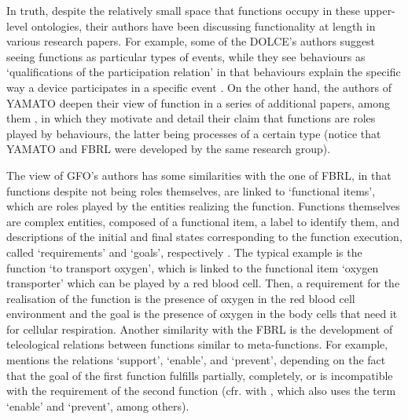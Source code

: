 \documentclass[sw]{iosart2x}
\newcommand{\DOLCE}{\textsc{DOLCE}\xspace} %
\newcommand{\YAMATO}{\textsc{YAMATO}\xspace}
\newcommand{\GFO}{\textsc{GFO}\xspace}
\begin{document}
In truth, despite the relatively small space that functions occupy in these upper-level ontologies, their authors have been discussing functionality at length in various research papers. 
For example, some of the \DOLCE's authors suggest seeing functions as particular types of events, while they see behaviours as `qualifications of the participation relation' in that behaviours explain the specific way a device participates in a specific event \cite{borgoCapabilitiesCapacitiesFunctionalities2021,borgoFormalizationFunctionsOperations2011, garbaczTwoOntologydrivenFormalisations2011}. On the other hand, the authors of \YAMATO deepen their view of function in a series of additional papers, among them \cite{kitamuraOntologicalModelDevice2006, kitamuraCharacterizingFunctionsBased2013, mizoguchiFunctionalOntologyArtifacts2009,mizoguchiUnifyingDefinitionArtifact2016}, in which they motivate and detail their claim that functions are roles played by behaviours, the latter being processes of a certain type (notice that \YAMATO  and FBRL were developed by the same research group).

The view of \GFO's authors has some similarities with the one of FBRL, in that functions despite not being roles themselves, are linked to `functional items', which are roles played by the entities realizing the function. Functions themselves are complex entities, composed of a functional item, a label to identify them, and descriptions of the initial and final states corresponding to the function execution, called `requirements' and `goals', respectively \cite{burekToplevelOntologyFunctions2006,burekOverviewGFOFunctions2021}. The typical example is the function `to transport oxygen', which is linked to the functional item `oxygen transporter' which can be played by a red blood cell. Then, a requirement for the realisation of the function is the presence of oxygen in the red blood cell environment and the goal is the presence of oxygen in the body cells that need it for cellular respiration. Another similarity with the FBRL is the development of teleological relations between functions similar to meta-functions. For example, \cite{burekToplevelOntologyFunctions2006} mentions the relations `support', `enable', and `prevent', depending on the fact that the goal of the first function fulfills partially, completely, or is incompatible with the requirement of the second function (cfr. with \cite{kitamuraMetaFunctionsArtifacts1999}, which also uses the term `enable' and `prevent', among others). 
\end{document}

